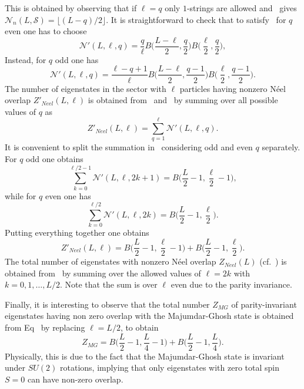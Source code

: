 \documentclass[11pt]{iopart}
\begin{document}
%
This is obtained by observing that if $\ell=q$ only $1$-strings are allowed 
and~ gives ${\mathcal N}_n(L,{\mathcal S})=\lfloor (L-q)/2\rfloor$. 
It is straightforward to check that to satisfy~ for $q$ even one has 
to choose 
%
\begin{equation}
\label{inter1}
{\mathcal N}'(L,\ell,q)=\frac{q}{\ell}B\Big(\frac{L-\ell}{2},\frac{q}{2}\Big)
B\Big(\frac{\ell}{2},\frac{q}{2}\Big),
\end{equation}
% 
Instead, for $q$ odd one has
%
\begin{equation}
\label{inter2}
{\mathcal N}'(L,\ell,q)=\frac{\ell-q+1}{\ell}B\Big(\frac{L-\ell}{2},\frac{q-1}{2}
\Big)B\Big(\frac{\ell}{2},\frac{q-1}{2}\Big).
\end{equation}
%
The number of eigenstates in the sector with $\ell$ particles having nonzero N\'eel 
overlap $Z'_{Neel}(L,\ell)$ is obtained from~ and~ by 
summing over all possible values of $q$ as 
%
\begin{equation}
\label{sum1}
Z'_{Neel}(L,\ell)=\sum\limits_{q=1}^\ell {\mathcal N}'(L,\ell,q).
\end{equation}
%
It is convenient to split the summation in~ considering odd and even 
$q$ separately. For $q$ odd one obtains 
%
\begin{equation}
\sum\limits_{k=0}^{\ell/2-1} {\mathcal N}'(L,\ell,2k+1)=B\Big(\frac{L}{2}-1,
\frac{\ell}{2}-1\Big),
\end{equation}
%
while for $q$ even one has 
%
\begin{equation}
\sum\limits_{k=0}^{\ell/2} {\mathcal N}'(L,\ell,2k)=B\Big(\frac{L}{2}-1,
\frac{\ell}{2}\Big). 
\end{equation}
%
Putting everything together one obtains 
%
\begin{equation}
\label{N-count-p}
Z'_{Neel}(L,\ell)=B\Big(\frac{L}{2}-1,
\frac{\ell}{2}-1\Big)+B\Big(\frac{L}{2}-1,
\frac{\ell}{2}\Big). 
\end{equation}
%
The total number of eigenstates with nonzero N\'eel overlap $Z_{Neel}(L)$ 
(cf.~) is obtained from~ by summing over the allowed 
values of $\ell=2k$ with $k=0,1,\dots,L/2$. Note that the sum is over $\ell$ even 
due to the parity invariance. 

Finally, it is interesting to observe that the total number $Z_{MG}$ of parity-invariant 
eigenstates having non zero overlap with the Majumdar-Ghosh state is obtained from 
Eq~ by replacing $\ell=L/2$, to obtain 
%
\begin{equation}
\label{p-inv-mg}
Z_{MG}=B\Big(\frac{L}{2}-1,\frac{L}{4}-1\Big)+B\Big(\frac{L}{2}-1,\frac{L}{4}
\Big). 
\end{equation}
%
Physically, this is due to the fact that the Majumdar-Ghosh state is invariant under 
$SU(2)$ rotations, implying that only eigenstates with zero total spin $S=0$ can have 
non-zero overlap. 
\end{document}
